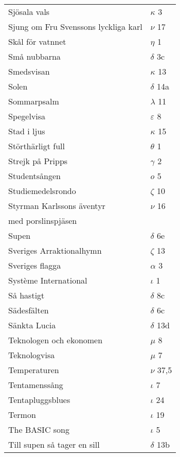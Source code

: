 \documentclass[a6paper,10pt]{article}
\begin{document}
\newpage
\setlength{\oddsidemargin}{-0.37in}
\begin{table}[!h]
\begin{tabular}{l l}
Sjösala vals	&$\kappa$ 3\\
Sjung om Fru Svenssons lyckliga karl&	$\nu$ 17\\
Skål för vatnnet&	$\eta$ 1\\
Små nubbarna&	$\delta$ 3c\\
Smedsvisan	&$\kappa$ 13\\
Solen	&$\delta$ 14a\\
Sommarpsalm	&$\lambda$ 11\\
Spegelvisa&	$\varepsilon$ 8\\
Stad i ljus&       $\kappa$ 15\\
Störthärligt full&	$\theta$ 1\\
Strejk på Pripps&	$\gamma$ 2\\
Studentsången&	$o$ 5\\
Studiemedelsrondo&$\zeta$ 10\\
Styrman Karlssons äventyr &$\nu$ 16\\
med porslinspjäsen	&\\
Supen	&$\delta$ 6e\\
Sveriges Arraktionalhymn	&$\zeta$ 13\\
Sveriges flagga	&$\alpha$ 3\\
Système International&	$\iota$ 1\\
Så hastigt	&$\delta$ 8c\\
Sädesfälten	&$\delta$ 6c\\
Sänkta Lucia	&$\delta$ 13d\\
Teknologen och ekonomen&$\mu$ 8\\
Teknologvisa	&$\mu$ 7\\
Temperaturen	&$\nu$ 37,5\\
Tentamenssång&	$\iota$ 7\\
Tentapluggsblues&$\iota$ 24\\
Termon&	$\iota$ 19\\
The BASIC song	&$\iota$ 5\\
Till supen så tager en sill	&$\delta$ 13b\\
\end{tabular}
\end{table}
\end{document}
